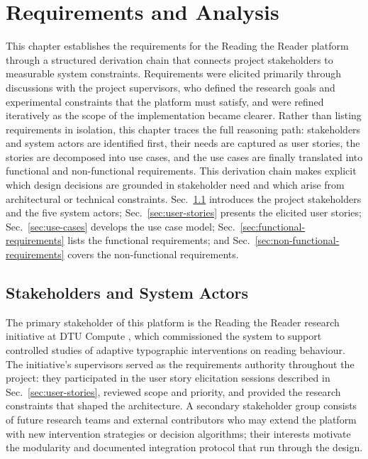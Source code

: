 \chapter{Requirements and Analysis}
\label{ch:requirements}

This chapter establishes the requirements for the Reading the Reader platform through a structured derivation chain that connects project stakeholders to measurable system constraints.
Requirements were elicited primarily through discussions with the project supervisors, who defined the research goals and experimental constraints that the platform must satisfy, and were refined iteratively as the scope of the implementation became clearer.
Rather than listing requirements in isolation, this chapter traces the full reasoning path: stakeholders and system actors are identified first, their needs are captured as user stories, the stories are decomposed into use cases, and the use cases are finally translated into functional and non-functional requirements.
This derivation chain makes explicit which design decisions are grounded in stakeholder need and which arise from architectural or technical constraints.
Sec.~\ref{sec:stakeholders} introduces the project stakeholders and the five system actors; Sec.~\ref{sec:user-stories} presents the elicited user stories; Sec.~\ref{sec:use-cases} develops the use case model; Sec.~\ref{sec:functional-requirements} lists the functional requirements; and Sec.~\ref{sec:non-functional-requirements} covers the non-functional requirements.

\section{Stakeholders and System Actors}
\label{sec:stakeholders}

The primary stakeholder of this platform is the Reading the Reader research initiative at DTU Compute \cite{ref1}, which commissioned the system to support controlled studies of adaptive typographic interventions on reading behaviour.
The initiative's supervisors served as the requirements authority throughout the project: they participated in the user story elicitation sessions described in Sec.~\ref{sec:user-stories}, reviewed scope and priority, and provided the research constraints that shaped the architecture.
A secondary stakeholder group consists of future research teams and external contributors who may extend the platform with new intervention strategies or decision algorithms; their interests motivate the modularity and documented integration protocol that run through the design.

